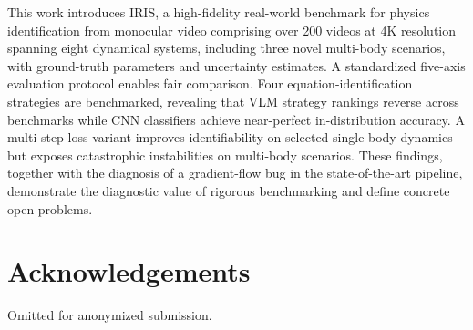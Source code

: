 \documentclass[runningheads]{llncs}
\begin{document}
This work introduces IRIS, a high-fidelity real-world benchmark for physics identification from monocular video comprising over 200 videos at 4K resolution spanning eight dynamical systems, including three novel multi-body scenarios, with ground-truth parameters and uncertainty estimates. A standardized five-axis evaluation protocol enables fair comparison. Four equation-identification strategies are benchmarked, revealing that VLM strategy rankings reverse across benchmarks while CNN classifiers achieve near-perfect in-distribution accuracy. A multi-step loss variant improves identifiability on selected single-body dynamics but exposes catastrophic instabilities on multi-body scenarios. These findings, together with the diagnosis of a gradient-flow bug in the state-of-the-art pipeline, demonstrate the diagnostic value of rigorous benchmarking and define concrete open problems. 

\section*{Acknowledgements}
Omitted for anonymized submission.

{\sloppy\printbibliography}
\end{document}
